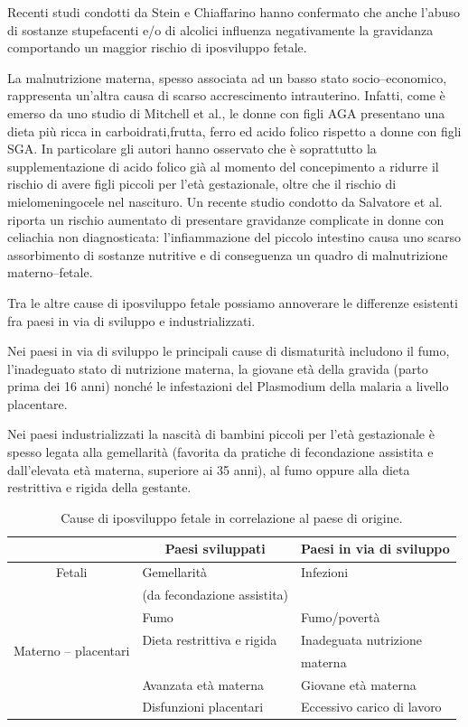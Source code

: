 Recenti studi condotti da Stein e Chiaffarino hanno confermato che anche l'abuso di sostanze stupefacenti e/o di alcolici influenza negativamente la gravidanza comportando un maggior rischio di iposviluppo fetale\cite{sga-24}\cite{sga-25}.

La malnutrizione materna, spesso associata ad un basso stato socio--economico, rappresenta un'altra causa di scarso accrescimento intrauterino. 
Infatti, come \`e emerso da uno studio di Mitchell et al., le donne con figli AGA presentano una dieta più ricca in carboidrati,frutta, ferro ed acido folico rispetto a donne con figli SGA. In particolare gli autori hanno osservato che è soprattutto la supplementazione di acido folico già al momento del concepimento a ridurre il rischio di avere figli piccoli per l'età gestazionale, oltre che il rischio di mielomeningocele nel nascituro.\cite{sga-26}
Un recente studio condotto da Salvatore et al. riporta un rischio aumentato di presentare gravidanze complicate in donne con celiachia non diagnosticata: l'infiammazione del piccolo intestino causa uno
scarso assorbimento di sostanze nutritive e di conseguenza un quadro di malnutrizione materno--fetale\cite{sga-15}.

Tra le altre cause di iposviluppo fetale possiamo annoverare le differenze esistenti fra paesi in via di sviluppo e industrializzati.

Nei paesi in via di sviluppo le principali cause di dismaturità includono il fumo, l'inadeguato stato di 
nutrizione materna, la giovane età della gravida (parto prima dei 16 anni) nonché le infestazioni del Plasmodium della malaria a 
livello placentare.

Nei paesi industrializzati la nascità di bambini piccoli per l'età gestazionale
è spesso legata alla gemellarità (favorita da pratiche di fecondazione assistita
e dall'elevata età materna, superiore ai 35 anni), al fumo oppure alla dieta restrittiva e rigida della gestante.

\begin{table}[h]\centering
\begin{tabular}{cll}
\toprule
			& \multicolumn{1}{c}{Paesi sviluppati}			& \multicolumn{1}{c}{Paesi in via di sviluppo} \\
\midrule
Fetali & Gemellarit\`a  			& Infezioni			\\
 & (da fecondazione assistita) & \\\midrule
\multirow{4}{*}{Materno -- placentari} & Fumo						& Fumo/povertà		\\\cmidrule(l){2-3}
			& Dieta restrittiva e rigida	& Inadeguata nutrizione\\
			& &  materna \\\cmidrule(l){2-3}
			& Avanzata età materna  &	Giovane età materna \\\cmidrule(l){2-3}
			& Disfunzioni placentari	& Eccessivo carico di lavoro	\\\bottomrule
\end{tabular}
\label{tab-cause}
\caption{Cause di iposviluppo fetale in correlazione al paese di origine.}
\end{table}

